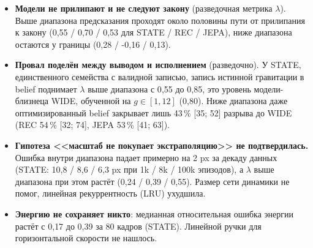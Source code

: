 {\begin{itemize}
\item \textbf{Модели не прилипают и не следуют закону} (разведочная метрика $\lambda$). Выше диапазона предсказания проходят около половины пути от прилипания к закону (0{,}55 / 0{,}70 / 0{,}53 для STATE / REC / JEPA), ниже диапазона остаются у границы (0{,}28 / -0{,}16 / 0{,}13).
\item \textbf{Провал поделён между выводом и исполнением} (разведочно). У STATE, единственного семейства с валидной записью, запись истинной гравитации в belief поднимает $\lambda$ выше диапазона с 0{,}55 до 0{,}85, это уровень модели-близнеца WIDE, обученной на $g\in[1,12]$ (0{,}80). Ниже диапазона даже оптимизированный belief закрывает лишь 43\,\% [35; 52] разрыва до WIDE (REC 54\,\% [32; 74], JEPA 53\,\% [41; 63]).
\item \textbf{Гипотеза <<масштаб не покупает экстраполяцию>> не подтвердилась.} Ошибка внутри диапазона падает примерно на 2 px за декаду данных (STATE: 10{,}8 / 8{,}6 / 6{,}3 px при 1k / 8k / 100k эпизодов), а $\lambda$ выше диапазона при этом растёт (0{,}24 / 0{,}39 / 0{,}55). Размер сети динамики не помог, линейная рекуррентность (LRU) ухудшила.
\item \textbf{Энергию не сохраняет никто}: медианная относительная ошибка энергии растёт с 0{,}17 до 0{,}39 за 80 кадров (STATE). Линейной ручки для горизонтальной скорости не нашлось.
\end{itemize}
}
